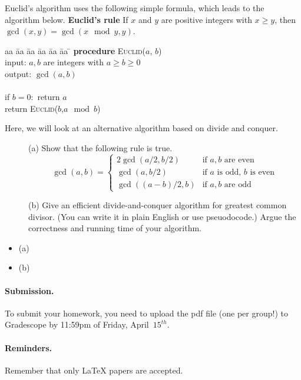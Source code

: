 \documentclass{article}
\begin{document}
\vskip 0.25in

\begin{problem} %
Euclid's algorithm uses the following simple formula, which leads to the algorithm below. 
\vskip 0.2in
\noindent \textbf{Euclid's rule} If $x$ and $y$ are positive integers with $x \ge y$, then $\gcd(x,y) = \gcd(x \mod y,y)$.

\begin{tabbing}
aa \= aa \= aa \= aa \= aa \= aa \= \kill
\textbf{procedure} \textsc{Euclid}($a$, $b$) \\
input: $a,b$ are integers with $a \ge b \ge 0$\\
output: $\gcd(a, b)$\\\\
if $b=0:$ return $a$\\
return \textsc{Euclid}($b$,$a \mod b$)
\end{tabbing}
Here, we will look at an alternative algorithm based on divide and conquer.
\begin{description}
\item[]{(a)} Show that the following rule is true. 
$$\gcd(a, b) = \begin{cases}
2\gcd(a/2,b/2) & \text{if $a,b$ are even} \\
\gcd(a,b/2) & \text{if $a$ is odd, $b$ is even} \\
\gcd((a-b)/2,b) & \text{if $a,b$ are odd}
\end{cases}$$
\item[]{(b)} Give an efficient divide-and-conquer algorithm for greatest common divisor. (You can write it in plain English or use pseuodocode.) Argue the correctness and running time of your algorithm.
\end{description}
\end{problem}

\begin{solution}
\begin{itemize}
	\item[]{(a)}
	\item[]{(b)}
\end{itemize}
\end{solution}


\paragraph{Submission.}
To submit your homework, you need to upload the pdf file (one per group!) to Gradescope by 11:59pm of Friday, April~$15^{th}$. 

\paragraph{Reminders.}
Remember that only {\LaTeX} papers are accepted. 
\end{document}
